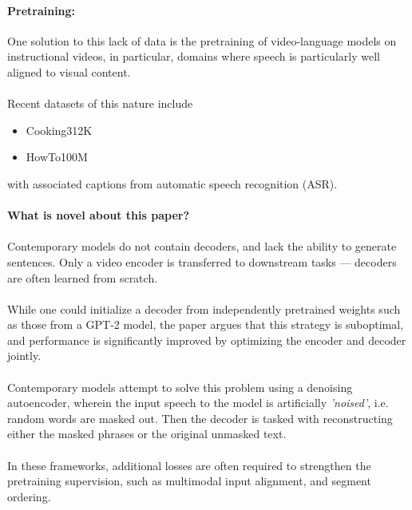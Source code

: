 \documentclass{article}
\begin{document}
\paragraph{Pretraining:}One solution to this lack of data is the pretraining of video-language
models on instructional videos, in particular, domains where speech is particularly well aligned to 
visual content.

\paragraph{}Recent datasets of this nature include
\begin{itemize}
    \item Cooking312K
    \item HowTo100M
\end{itemize}

with associated captions from automatic speech recognition (ASR).

\paragraph{What is novel about this paper?}
\paragraph{}Contemporary models do not contain decoders, and lack the ability to generate
sentences. Only a video encoder is transferred to downstream tasks --- decoders are often
learned from scratch. 

\paragraph{}While one could initialize a decoder from independently pretrained weights such
as those from a GPT-2 model, the paper argues that this strategy is suboptimal, and performance
is significantly improved by optimizing the encoder and decoder jointly.

\paragraph{}Contemporary models attempt to solve this problem using a denoising autoencoder, wherein
the input speech to the model is artificially \emph{'noised'}, i.e. random words are masked out. Then the
decoder is tasked with reconstructing either the masked phrases or the original unmasked text. 

\paragraph{}In these frameworks, additional losses are often required to strengthen the pretraining
supervision, such as multimodal input alignment, and segment ordering.
\end{document}
